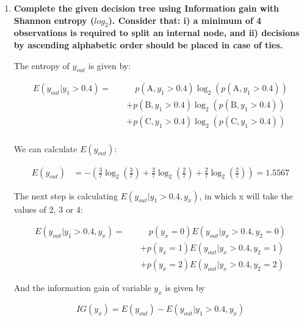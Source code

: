 \documentclass[12pt]{article}
\begin{document}
\begin{enumerate}[leftmargin=\labelsep]
    \item \textbf{Complete the given decision tree using Information gain with Shannon entropy ($log_2$).
    Consider that: i) a minimum of 4 observations is required to split an internal node, and
    ii) decisions by ascending alphabetic order should be placed in case of ties.}

    \vskip 0.3cm
    The entropy of \(y_{out}\) is given by:

    \begin{equation}
        \begin{split}
            E(y_{out} |y_1 > 0.4) = \quad
            & \quad  p(\text{A}, y_1 > 0.4) \log_2 \left(p(\text{A}, y_1 > 0.4)\right)  \\
            & + p(\text{B}, y_1 > 0.4) \log_2 \left(p(\text{B}, y_1 > 0.4)\right) \\
            & + p(\text{C}, y_1 > 0.4) \log_2 \left(p(\text{C}, y_1 > 0.4)\right) \\
        \end{split}
    \end{equation}

    We can calculate $E(y_{out})$:

    \[
        \begin{aligned}
            E(y_{out}) & = - \left(\frac{3}{7} \log_2\left(\frac{3}{7}\right) + \frac{2}{7} \log_2\left(\frac{2}{7}\right)
                            + \frac{2}{7} \log_2\left(\frac{2}{7}\right)\right) = 1.5567
        \end{aligned}
    \]

    The next step is calculating $E(y_{out} | y_1 > 0.4 , y_x)$, in which x will take the values of 2, 3 or 4:

    \begin{equation}\label{exI1-e-yout-y2}
        \begin{split}
            E(y_{out} |y_1 > 0.4 , y_x) = \quad
            & \quad  p(y_x = 0) E(y_{out} | y_x > 0.4 , y_2 = 0) \\
            & + p(y_x = 1) E(y_{out} | y_x > 0.4 , y_2 = 1) \\
            & + p(y_x = 2) E(y_{out} | y_x > 0.4 , y_2 = 2)
        \end{split}
    \end{equation}

    And the information gain of variable $y_x$ is given by

    \begin{equation}\label{ex1-ig}
        IG(y_x) = E(y_{out}) - E(y_{out} |y_1 > 0.4, y_x)
    \end{equation}


\end{enumerate}
\end{document}
